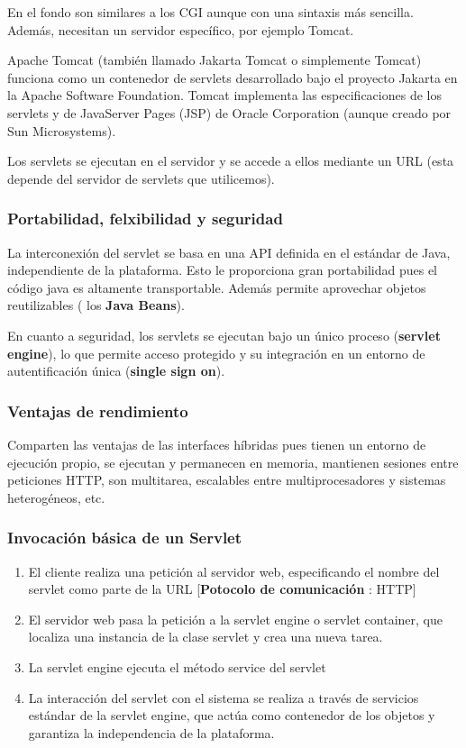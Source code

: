 \documentclass{apuntes}
\begin{document}
En el fondo son similares a los CGI aunque con una sintaxis más sencilla. Además, necesitan un servidor específico, por ejemplo Tomcat.

\begin{defn}[Tomcat]
Apache Tomcat (también llamado Jakarta Tomcat o simplemente Tomcat) funciona como un contenedor de servlets desarrollado bajo el proyecto Jakarta en la Apache Software Foundation. Tomcat implementa las especificaciones de los servlets y de JavaServer Pages (JSP) de Oracle Corporation (aunque creado por Sun Microsystems).
\end{defn}

Los servlets se ejecutan en el servidor y se accede a ellos mediante un URL (esta depende del servidor de servlets que utilicemos).

\subsubsection{Portabilidad, felxibilidad y seguridad}
La interconexión del servlet se basa en una API definida en el estándar de Java, independiente de la plataforma. Esto le proporciona gran portabilidad pues el código java es altamente transportable. Además permite aprovechar objetos reutilizables ( los \textbf{Java Beans}).

En cuanto a seguridad, los servlets se ejecutan bajo un único proceso (\textbf{servlet engine}), lo que permite acceso protegido y su integración en un entorno de autentificación única (\textbf{single sign on}).

\subsubsection{Ventajas de rendimiento}
Comparten las ventajas de las interfaces híbridas pues tienen un entorno de ejecución propio, se ejecutan y permanecen en memoria, mantienen sesiones entre peticiones HTTP, son multitarea, escalables entre multiprocesadores y sistemas heterogéneos, etc.

\subsubsection{Invocación básica de un Servlet}
\begin{enumerate}
\item El cliente realiza una petición al servidor web, especificando el nombre del servlet como parte de la URL
[\textbf{Potocolo de comunicación} : HTTP]
\item El servidor web pasa la petición a la servlet engine o servlet container, que localiza una instancia de la clase servlet y crea una nueva tarea.
\item La servlet engine ejecuta el método service del servlet
\item La interacción del servlet con el sistema se realiza a través de servicios estándar de la servlet engine, que actúa como contenedor de los objetos y garantiza la independencia de la plataforma.
\end{enumerate}
\end{document}
